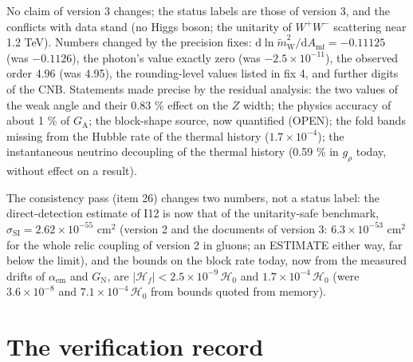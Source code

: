 \documentclass[
  10pt,
]{article}
\begin{document}
No claim of version 3 changes; the status labels are those of version 3,
and the conflicts with data stand (no Higgs boson; the unitarity of
\(W^+W^-\) scattering near 1.2 TeV). Numbers changed by the precision
fixes:
\(\mathrm{d}\ln\tilde m_{\mathrm{W}}^2/\mathrm{d}A_{\mathrm{mf}} = -0.11125\)
(was \(-0.1126\)), the photon's value exactly zero (was
\(-2.5\times10^{-11}\)), the observed order 4.96 (was 4.95), the
rounding-level values listed in fix 4, and further digits of the CNB.
Statements made precise by the residual analysis: the two values of the
weak angle and their 0.83 \% effect on the \(Z\) width; the physics
accuracy of about 1 \% of \(G_{\mathrm{A}}\); the block-shape source,
now quantified (OPEN); the fold bands missing from the Hubble rate of
the thermal history (\(1.7\times10^{-4}\)); the instantaneous neutrino
decoupling of the thermal history (0.59 \% in \(g_\rho\) today, without
effect on a result).

The consistency pass (item 26) changes two numbers, not a status label:
the direct-detection estimate of I12 is now that of the unitarity-safe
benchmark, \(\sigma_{\mathrm{SI}} = 2.62\times10^{-55}\) cm\(^2\)
(version 2 and the documents of version 3: \(6.3\times10^{-53}\)
cm\(^2\) for the whole relic coupling of version 2 in gluons; an
ESTIMATE either way, far below the limit), and the bounds on the block
rate today, now from the measured drifts of \(\alpha_{\mathrm{em}}\) and
\(G_{\mathrm{N}}\), are
\(\lvert\mathcal{H}_f\rvert < 2.5\times10^{-9}\,\mathcal{H}_0\) and
\(1.7\times10^{-4}\,\mathcal{H}_0\) (were \(3.6\times10^{-8}\) and
\(7.1\times10^{-4}\,\mathcal{H}_0\) from bounds quoted from memory).

\hypertarget{the-verification-record}{%
\section{The verification record}\label{the-verification-record}}
\end{document}
